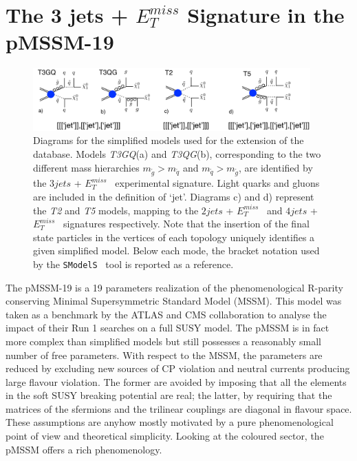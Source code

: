 \documentclass[a4paper,11pt]{article}
\newcommand{\MET}{{ $E_T ^{miss}$}}
\newcommand{\SMO}{\texttt{SModelS\xspace}}
\begin{document}
\section{The 3 jets + $E_T ^{miss}$ Signature in the pMSSM-19 }\label{sec::T3GQ}
\begin{figure}[!ht]
	\begin{center}
		\includegraphics[width=0.95\textwidth]{PLOTS/diagrams.png}
	\end{center}
	\caption{Diagrams for the simplified models used for the extension of the database. Models \textit{T3GQ}(a) and \textit{T3QG}(b), corresponding to the two different mass hierarchies $m_{\tilde g} > m_{\tilde q}$ and $m_{\tilde q} > m_{\tilde g}$, are identified by the $3jets$ + \MET~ experimental signature. Light quarks and gluons are included in the definition of `jet'. Diagrams c) and d) represent the \textit{T2} and \textit{T5} models, mapping to the $2jets$ + \MET~ and $4jets$ + \MET~  signatures respectively. Note that the insertion of the final state particles in the vertices of each topology uniquely identifies a given simplified model. Below each mode, the bracket notation used by the \SMO~ tool is reported as a reference.}
	\label{Diagrams}
\end{figure}

The pMSSM-19 is a 19 parameters realization of the phenomenological R-parity conserving Minimal Supersymmetric Standard Model (MSSM). This model was taken as a benchmark by the ATLAS\cite{Aad:2015baa} and CMS\cite{Khachatryan:2016nvf} collaboration to analyse the impact of their Run 1 searches on a full SUSY model. The pMSSM is in fact more complex than simplified models but still possesses a reasonably small number of free parameters. With respect to the MSSM, the parameters are reduced by excluding new sources of CP violation and neutral currents producing large flavour violation. The former are avoided by imposing that all the elements in the soft SUSY breaking potential are real; the latter, by requiring that the matrices of the sfermions and the trilinear couplings are diagonal in flavour space. These assumptions are anyhow mostly motivated by a pure phenomenological point of view and theoretical simplicity. Looking at the coloured sector, the pMSSM offers a rich phenomenology.
\\
\end{document}
